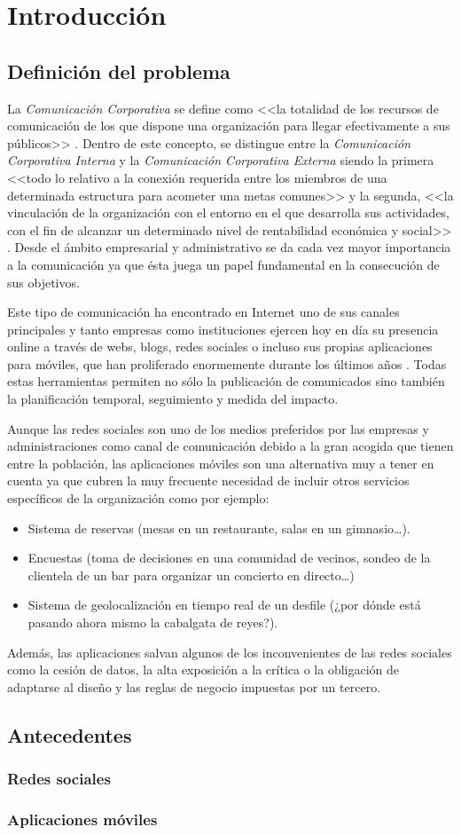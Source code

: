 \chapter{Introducción}
\section{Definición del problema}
La \emph{Comunicación Corporativa} se define como <<la totalidad de los recursos de comunicación de los que dispone una organización para llegar efectivamente a sus públicos>> \cite{riel_2001}. Dentro de este concepto, se distingue entre la \emph{Comunicación Corporativa Interna} y la \emph{Comunicación Corporativa Externa} siendo la primera <<todo lo relativo a la conexión requerida entre los miembros de una determinada estructura para acometer una metas comunes>> y la segunda, <<la vinculación de la organización con el entorno en el que desarrolla sus actividades, con el fin de alcanzar un determinado nivel de rentabilidad económica y social>> \cite{castro_2007}. Desde el ámbito empresarial y administrativo se da cada vez mayor importancia a la comunicación ya que ésta juega un papel fundamental en la consecución de sus objetivos.

Este tipo de comunicación ha encontrado en Internet uno de sus canales principales y tanto empresas como instituciones ejercen hoy en día su presencia online a través de webs, blogs, redes sociales o incluso sus propias aplicaciones para móviles, que han proliferado enormemente durante los últimos años \cite{playstore} \cite{appstore}. Todas estas herramientas permiten no sólo la publicación de comunicados sino también la planificación temporal, seguimiento y medida del impacto.

Aunque las redes sociales son uno de los medios preferidos por las empresas \cite{linkedin} y administraciones \cite{grande2015casos} como canal de comunicación debido a la gran acogida que tienen entre la población, las aplicaciones móviles son una alternativa muy a tener en cuenta ya que cubren la muy frecuente necesidad de incluir otros servicios específicos de la organización como por ejemplo:
\begin{itemize}
    \item Sistema de reservas (mesas en un restaurante, salas en un gimnasio\dots).
    \item Encuestas (toma de decisiones en una comunidad de vecinos, sondeo de la clientela de un bar para organizar un concierto en directo\dots)
    \item Sistema de geolocalización en tiempo real de un desfile (¿por dónde está pasando ahora mismo la cabalgata de reyes?).
\end{itemize}
Además, las aplicaciones salvan algunos de los inconvenientes de las redes sociales como la cesión de datos, la alta exposición a la crítica o la obligación de adaptarse al diseño y las reglas de negocio impuestas por un tercero.

\section{Antecedentes}
\subsection{Redes sociales}

\subsection{Aplicaciones móviles}